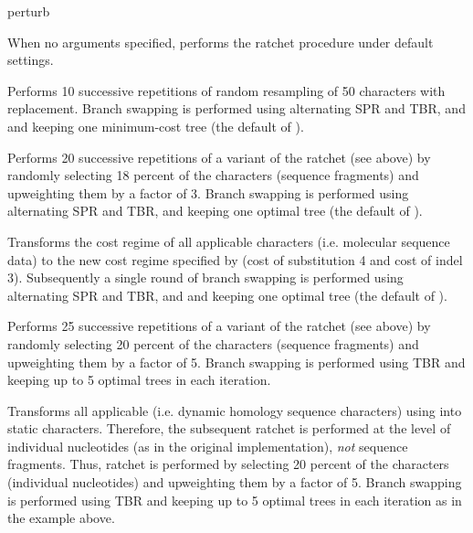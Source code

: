 \begin{command}{perturb}{}
\begin{arguments}
    \end{arguments}

        {When no arguments specified, \poy performs the ratchet procedure under
        default settings.}
    
    \begin{poyexamples}
    
            {Performs 10 successive repetitions of random resampling of 50
            characters with replacement. Branch swapping is performed
            using alternating SPR and TBR, and and keeping one minimum-cost tree
            (the default of ).}
    
            {Performs 20 successive repetitions of a variant of the ratchet (see
            above) by randomly selecting 18 percent of the characters (sequence
            fragments) and upweighting them by a factor of 3. Branch swapping is
            performed using alternating SPR and TBR, and keeping one
            optimal tree (the default of ).}

            {Transforms the cost regime of all applicable characters (i.e.
            molecular sequence data) to the new cost regime specified by
             (cost of substitution 4 and cost of indel 3).
            Subsequently a single round of branch swapping is
            performed using alternating SPR and TBR, and and keeping one
            optimal tree (the default of ).}
            
            {Performs 25 successive repetitions of a variant of the ratchet (see
            above) by randomly selecting 20 percent of the characters (sequence
            fragments) and upweighting them by a factor of 5. Branch swapping is
            performed using TBR and keeping up to 5 optimal trees in each iteration.}
            
            {Transforms all applicable (i.e. dynamic homology sequence
            characters) using  into static characters.
            Therefore, the subsequent ratchet is performed at the level of
            individual nucleotides (as in the original implementation),
            \emph{not} sequence fragments. Thus, ratchet is performed by
            selecting 20 percent of the characters (individual nucleotides) and
            upweighting them by a factor of 5.  Branch swapping is performed
            using TBR and keeping up to 5 optimal trees in each iteration as in
            the example above.}


\end{poyexamples}
\end{command}

